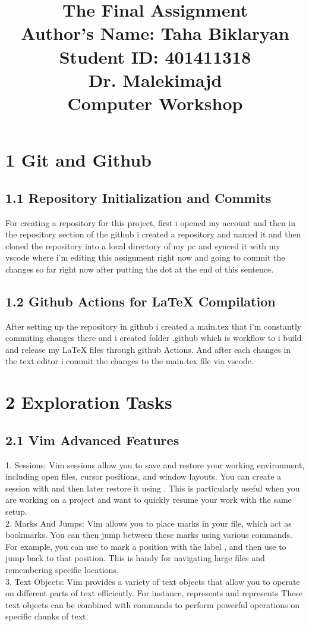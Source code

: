 \documentclass{article}
\title{\Huge The Final Assignment \\[1cm]
\Large Author's Name: Taha Biklaryan \\[0.5cm]
\large Student ID: 401411318 \\[1cm]  
\large Dr. Malekimajd \\[1cm]
\large Computer Workshop}
\date{} %
\begin{document}
\maketitle
\newpage
\section*{\Huge 1 Git and Github}
\subsection*{\Large 1.1 Repository Initialization and Commits}
For creating a repository for this project, first i opened my account and then in the repository section of the github i created a repository and named it  and then 
cloned the repository into a local directory of my pc and synced it with my vscode where i'm editing this assignment right now and going to commit the changes so far right now after putting the dot
at the end of this sentence.\\
\subsection*{\Large 1.2 Github Actions for LaTeX Compilation}
After setting up the repository in github i created a main.tex that i'm constantly commiting changes there
and i created folder .github which is workflow to i build and release my LaTeX files through github Actions.
And after each changes in the text editor i commit the changes to the main.tex file via vscode.\\


\section*{\Huge 2 Exploration Tasks}
\subsection*{\Large 2.1 Vim Advanced Features}
1. Sessions:
Vim sessions allow you to save and restore your working environment, including open files, cursor positions, and window layouts. You can create a session with  and then later restore it using . This is particularly useful when you are working on a project and want to quickly resume your work with the same setup.\\
2. Marks And Jumps:
Vim allows you to place marks in your file, which act as bookmarks. You can then jump between these marks using various commands. For example, you can use  to mark a position with the label , and then use  to jump back to that position. This is handy for navigating large files and remembering specific locations.\\
3. Text Objects:
Vim provides a variety of text objects that allow you to operate on different parts of text efficiently. For instance,  represents  and  represents  These text objects can be combined with commands to perform powerful operations on specific chunks of text.\\
\end{document}
